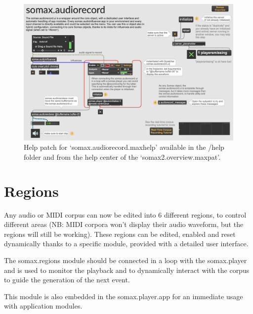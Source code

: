 \begin{figure}[H]
    \centering        
 	\includegraphics[width=1\textwidth, keepaspectratio]{somax2-6-user-guide/img/audiorecord_ui_help.png}
    \caption{Help patch for `somax.audiorecord.maxhelp' available in the /help folder and from the help center of the `somax2.overview.maxpat'.}
    \label{fig:audiorecord_ui_help}
\end{figure}



\section{Regions}

Any audio or MIDI corpus can now be edited into 6 different regions, to control different areas (NB: MIDI corpora won't display their audio waveform, but the regions will still be working). These regions can be edited, enabled and reset dynamically thanks to a specific module, provided with a detailed user interface.

The somax.regions module should be connected in a loop with the somax.player and is used to monitor the playback and to dynamically interact with the corpus to guide the generation of the next event. 

This module is also embedded in the somax.player.app for an immediate usage with application modules.



